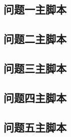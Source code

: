 \documentclass[UTF8,a4paper,fontset=none]{ctexart}
\numberwithin{equation}{section}
\begin{document}
\subsection{问题一主脚本}


\subsection{问题二主脚本}


\subsection{问题三主脚本}


\subsection{问题四主脚本}


\subsection{问题五主脚本}

\end{document}
